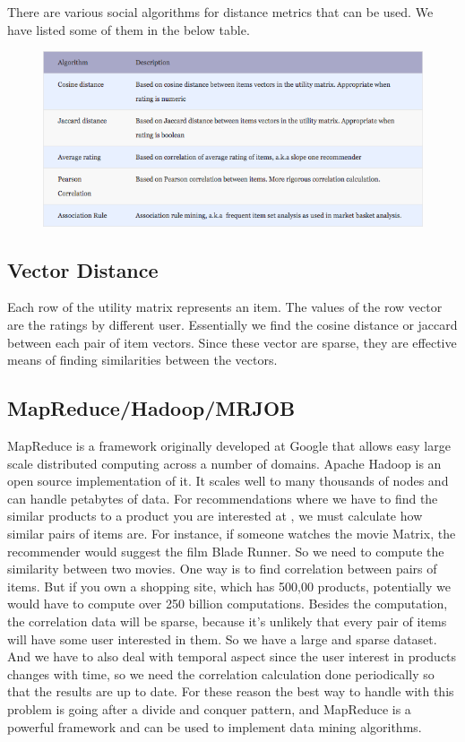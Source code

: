 \documentclass[12pt]{article} %
\begin{document}
There are various social algorithms for distance metrics that can be used. We have listed some of them in the below table.

\begin{figure}[h]
\begin{center}
\includegraphics[width=5in]{measure.png}
\end{center}
\end{figure}

\subsection{Vector Distance}

Each row of the utility matrix represents an item. The values of the row vector are the ratings by different user. Essentially we find the cosine distance or jaccard between each pair of item vectors. Since these vector are sparse, they are effective means of finding similarities between the vectors.

\subsection{MapReduce/Hadoop/MRJOB}

MapReduce is a framework originally developed at Google that allows easy large scale distributed computing across a number of domains. Apache Hadoop is an open source implementation of it.  It scales well to many thousands of nodes and can handle petabytes of data. For recommendations where we have to find the similar products to a product you are interested at , we must calculate how similar pairs of items are. For instance, if someone watches the movie Matrix, the recommender would suggest the film Blade Runner. So we need to compute the similarity between two movies. One way is to find correlation between pairs of items.  But if you own a shopping site, which has 500,00 products, potentially we would have to compute over 250 billion computations. Besides the computation, the correlation data will be sparse, because it's unlikely that every pair of items will have some user interested in them. So we have a large and sparse dataset. And we have to also deal with temporal aspect since the user interest in products changes with time, so we need the correlation calculation done periodically so that the results are up to date.  For these reason the best way to handle with this problem is going after a divide and conquer pattern, and MapReduce is a powerful framework and can be used to implement data mining algorithms.
\end{document}
